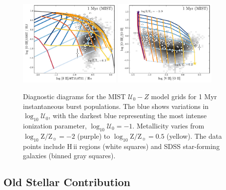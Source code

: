 \documentclass[trackchanges, twocolumn, tighten]{aastex61}
\newcommand{\logten}{\ensuremath{\log_{10}}}
\newcommand{\hii}{H\,{\sc ii}\xspace}
\newcommand{\logZeq}[1]{\ensuremath{\logten \mathrm{Z}/\mathrm{Z}_{\sun} = #1}}
\newcommand{\U}{\ensuremath{\mathcal{U}_{0}}}
\newcommand{\logU}{\ensuremath{\logten \mathcal{U}_0}}
\begin{document}
\begin{figure}
  \begin{centering}
    \includegraphics[width=0.45\textwidth]{f24a.pdf}
    \includegraphics[width=0.45\textwidth]{f24b.pdf}
    \caption{Diagnostic diagrams for the MIST $\U-Z$ model grids for 1 Myr instantaneous burst populations. The blue shows variations in \logU{}, with the darkest blue representing the most intense ionization parameter, $\logU{}=-1$. Metallicity varies from \logZeq{-2} (purple) to \logZeq{0.5} (yellow). The data points include \hii regions (white squares) and SDSS star-forming galaxies (binned gray squares).}
    \label{fig:MIST:altRatios}
  \end{centering}
\end{figure}



\subsection{Old Stellar Contribution}\label{sec:secondary:old}
\end{document}
